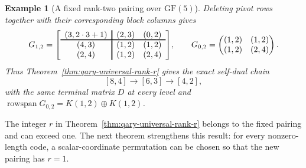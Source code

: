 \documentclass[12pt]{article}
\newtheorem{example}{Example}[section]
\newcommand{\GF}[1]{\ensuremath{\mathrm{GF}(#1)}}
\begin{document}
\begin{example}[A fixed rank-two pairing over \(\GF{5}\)]
Deleting pivot rows together with their corresponding block columns gives
\[
G_{1,2}=
{\arrayrulewidth=1.2pt
\left[\begin{array}{c!{\vrule width 1.2pt}cc}
(3,2\cdot3+1)&(2,3)&(0,2)\\[-1pt]
\noalign{\hrule height 1.2pt}
(4,3)&(1,2)&(1,2)\\
(2,4)&(1,2)&(2,4)
\end{array}\right]},\qquad
G_{0,2}=
\begin{pmatrix}
(1,2)&(1,2)\\
(1,2)&(2,4)
\end{pmatrix}.
\]
Thus Theorem~\ref{thm:qary-universal-rank-r} gives the exact self-dual chain
\[
[8,4]\longrightarrow[6,3]\longrightarrow[4,2],
\]
with the same terminal matrix \(D\) at every level and
\(\operatorname{rowspan}G_{0,2}=K(1,2)\oplus K(1,2)\).
\end{example}

The integer \(r\) in Theorem~\ref{thm:qary-universal-rank-r} belongs to the
fixed pairing and can exceed one.  The next theorem strengthens this result:
for every nonzero-length code, a scalar-coordinate permutation can be chosen
so that the new pairing has \(r=1\).
\end{document}
